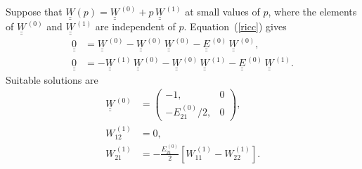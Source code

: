 \documentclass[12pt,prb,aps]{revtex4-1}
\begin{document}
Suppose that  $\underline{\underline{W}}(p)= \underline{\underline{W}}^{\,(0)}+ p\,\underline{\underline{W}}^{\,(1)}$ at small values of $p$,
where the elements of  $\underline{\underline{W}}^{\,(0)}$ and $\underline{\underline{W}}^{\,(1)}$ are independent of $p$. 
Equation~(\ref{ricc}) gives
\begin{align}
\underline{\underline{0}}&= \underline{\underline{W}}^{\,(0)}-\underline{\underline{W}}^{\,(0)}\,\underline{\underline{W}}^{\,(0)}- 
\underline{\underline{E}}^{\,(0)}\,\underline{\underline{W}}^{\,(0)},\\[0.5ex]
\underline{\underline{0}}&= -\underline{\underline{W}}^{\,(1)}\,\underline{\underline{W}}^{\,(0)}-\underline{\underline{W}}^{\,(0)}\,\underline{\underline{W}}^{\,(1)}- 
\underline{\underline{E}}^{\,(0)}\,\underline{\underline{W}}^{\,(1)}.
\end{align}
Suitable solutions are
\begin{align}\label{w0def}
\underline{\underline{W}}^{\,(0)} &=  \left(\begin{array}{cc} -1,&0\\-E_{21}^{\,(0)}/2,&0\end{array}\right),\\[0.5ex]
W_{12}^{\,(1)} &= 0,\\[0.5ex]
W_{21}^{\,(1)}& = -\frac{E_{21}^{\,(0)}}{2}\left[W_{11}^{\,(1)}- W_{22}^{\,(1)}\right].\label{w21def}
\end{align}
\end{document}

